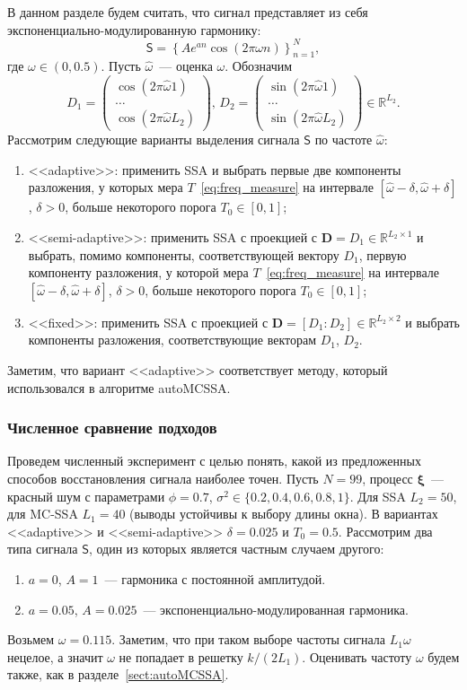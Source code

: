 \documentclass[specialist,
substylefile = spbu_report.rtx,
subf,href,colorlinks=true, 12pt]{disser}
\theoremstyle{definition}
\begin{document}
В данном разделе будем считать, что сигнал представляет из себя экспоненциально-модулированную гармонику:
\[
	\mathsf{S}=\left\{Ae^{a n}\cos(2\pi\omega n)\right\}_{n=1}^N,
\]
где $\omega\in(0, 0.5)$. Пусть $\hat\omega$~--- оценка $\omega$. Обозначим
\[
	D_1=\begin{pmatrix}
		\cos(2\pi\hat\omega 1) \\
		\ldots                 \\
		\cos(2\pi\hat\omega L_2)
	\end{pmatrix}, \,
	D_2=\begin{pmatrix}
		\sin(2\pi\hat\omega 1) \\
		\ldots                 \\
		\sin(2\pi\hat\omega L_2)
	\end{pmatrix}\in \mathbb{R}^{L_2}.
\]
Рассмотрим следующие варианты выделения сигнала $\mathsf{S}$ по частоте $\hat \omega$:
\begin{enumerate}
	\item <<adaptive>>: применить SSA и выбрать первые две компоненты разложения, у которых мера $T$~\eqref{eq:freq_measure} на интервале $[\hat\omega-\delta, \hat\omega+\delta]$, $\delta>0$, больше некоторого порога $T_0\in[0, 1]$;
	\item  <<semi-adaptive>>: применить SSA с проекцией с $\mathbf{D}=D_1\in \mathbb{R}^{L_2\times 1}$ и выбрать, помимо компоненты, соответствующей вектору $D_1$, первую компоненту разложения, у которой мера $T$~\eqref{eq:freq_measure} на интервале $[\hat\omega-\delta, \hat\omega+\delta]$, $\delta>0$, больше некоторого порога $T_0\in[0, 1]$;
	\item <<fixed>>: применить SSA с проекцией с $\mathbf{D}=[D_1:D_2]\in\mathbb{R}^{L_2\times 2}$ и выбрать компоненты разложения, соответствующие векторам $D_1$, $D_2$.
\end{enumerate}
Заметим, что вариант <<adaptive>> соответствует методу, который использовался в алгоритме autoMCSSA.

\subsubsection{Численное сравнение подходов}

Проведем численный эксперимент с целью понять, какой из предложенных способов восстановления сигнала наиболее точен. Пусть $N=99$, процесс $\bm\xi$~--- красный шум с параметрами $\phi=0.7$, $\sigma^2\in\{0.2, 0.4, 0.6, 0.8, 1\}$. Для SSA $L_2=50$, для MC-SSA $L_1=40$ (выводы устойчивы к выбору длины окна). В вариантах <<adaptive>> и <<semi-adaptive>> $\delta=0.025$ и $T_0=0.5$. Рассмотрим два типа сигнала $\mathsf{S}$, один из которых является частным случаем другого:
\begin{enumerate}
	\item $a=0$, $A=1$~--- гармоника с постоянной амплитудой.
	\item $a=0.05$, $A=0.025$~--- экспоненциально-модулированная гармоника.
\end{enumerate}
Возьмем $\omega=0.115$. Заметим, что при таком выборе частоты сигнала $L_1 \omega$ нецелое, а значит $\omega$ не попадает в решетку $k/(2L_1)$. Оценивать частоту $\omega$ будем также, как в разделе~\ref{sect:autoMCSSA}.
\end{document}
